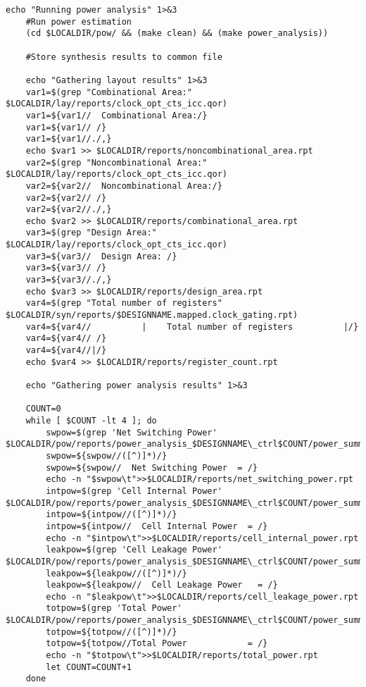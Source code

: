 \begin{lstlisting}[caption={HLS Script source code},label=lst:hlsscriptsourcecode]
	echo "Running power analysis" 1>&3
	#Run power estimation
	(cd $LOCALDIR/pow/ && (make clean) && (make power_analysis))
	
	#Store synthesis results to common file
	
	echo "Gathering layout results" 1>&3
	var1=$(grep "Combinational Area:" $LOCALDIR/lay/reports/clock_opt_cts_icc.qor)
	var1=${var1//  Combinational Area:/}
	var1=${var1// /}
	var1=${var1//./,}
	echo $var1 >> $LOCALDIR/reports/noncombinational_area.rpt
	var2=$(grep "Noncombinational Area:" $LOCALDIR/lay/reports/clock_opt_cts_icc.qor)
	var2=${var2//  Noncombinational Area:/}
	var2=${var2// /}
	var2=${var2//./,}
	echo $var2 >> $LOCALDIR/reports/combinational_area.rpt
	var3=$(grep "Design Area:" $LOCALDIR/lay/reports/clock_opt_cts_icc.qor)
	var3=${var3//  Design Area: /}
	var3=${var3// /}
	var3=${var3//./,}
	echo $var3 >> $LOCALDIR/reports/design_area.rpt
	var4=$(grep "Total number of registers" $LOCALDIR/syn/reports/$DESIGNNAME.mapped.clock_gating.rpt)
	var4=${var4//          |    Total number of registers          |/}
	var4=${var4// /}
	var4=${var4//|/}
	echo $var4 >> $LOCALDIR/reports/register_count.rpt
	
	echo "Gathering power analysis results" 1>&3
	
	COUNT=0
	while [ $COUNT -lt 4 ]; do
		swpow=$(grep 'Net Switching Power' $LOCALDIR/pow/reports/power_analysis_$DESIGNNAME\_ctrl$COUNT/power_summary.rpt)
		swpow=${swpow//([^)]*)/}
		swpow=${swpow//  Net Switching Power  = /}
		echo -n "$swpow\t">>$LOCALDIR/reports/net_switching_power.rpt
		intpow=$(grep 'Cell Internal Power' $LOCALDIR/pow/reports/power_analysis_$DESIGNNAME\_ctrl$COUNT/power_summary.rpt)
		intpow=${intpow//([^)]*)/}
		intpow=${intpow//  Cell Internal Power  = /}
		echo -n "$intpow\t">>$LOCALDIR/reports/cell_internal_power.rpt
		leakpow=$(grep 'Cell Leakage Power' $LOCALDIR/pow/reports/power_analysis_$DESIGNNAME\_ctrl$COUNT/power_summary.rpt)
		leakpow=${leakpow//([^)]*)/}
		leakpow=${leakpow//  Cell Leakage Power   = /}
		echo -n "$leakpow\t">>$LOCALDIR/reports/cell_leakage_power.rpt
		totpow=$(grep 'Total Power' $LOCALDIR/pow/reports/power_analysis_$DESIGNNAME\_ctrl$COUNT/power_summary.rpt)
		totpow=${totpow//([^)]*)/}
		totpow=${totpow//Total Power            = /}
		echo -n "$totpow\t">>$LOCALDIR/reports/total_power.rpt
		let COUNT=COUNT+1 
	done
	

\end{lstlisting}
